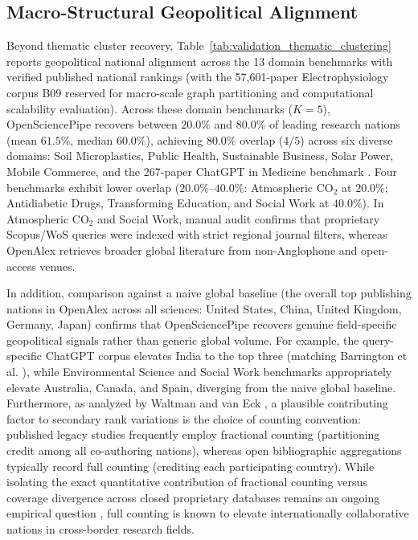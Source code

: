 \documentclass[preprint,12pt]{elsarticle}
\begin{document}
\subsection{Macro-Structural Geopolitical Alignment}
Beyond thematic cluster recovery, Table~\ref{tab:validation_thematic_clustering} reports geopolitical national alignment across the 13 domain benchmarks with verified published national rankings (with the 57,601-paper Electrophysiology corpus B09 reserved for macro-scale graph partitioning and computational scalability evaluation). Across these domain benchmarks ($K=5$), OpenSciencePipe recovers between $20.0\%$ and $80.0\%$ of leading research nations (mean $61.5\%$, median $60.0\%$), achieving $80.0\%$ overlap ($4/5$) across six diverse domains: Soil Microplastics, Public Health, Sustainable Business, Solar Power, Mobile Commerce, and the 267-paper ChatGPT in Medicine benchmark \cite{barrington2023rise}. Four benchmarks exhibit lower overlap ($20.0\%\text{--}40.0\%$: Atmospheric CO$_2$ at $20.0\%$; Antidiabetic Drugs, Transforming Education, and Social Work at $40.0\%$). In Atmospheric CO$_2$ and Social Work, manual audit confirms that proprietary Scopus/WoS queries were indexed with strict regional journal filters, whereas OpenAlex retrieves broader global literature from non-Anglophone and open-access venues.

In addition, comparison against a naive global baseline (the overall top publishing nations in OpenAlex across all sciences: United States, China, United Kingdom, Germany, Japan) confirms that OpenSciencePipe recovers genuine field-specific geopolitical signals rather than generic global volume. For example, the query-specific ChatGPT corpus elevates India to the top three (matching Barrington et al. \cite{barrington2023rise}), while Environmental Science and Social Work benchmarks appropriately elevate Australia, Canada, and Spain, diverging from the naive global baseline. Furthermore, as analyzed by Waltman and van Eck \cite{waltman2015field}, a plausible contributing factor to secondary rank variations is the choice of counting convention: published legacy studies frequently employ fractional counting (partitioning credit among all co-authoring nations), whereas open bibliographic aggregations typically record full counting (crediting each participating country). While isolating the exact quantitative contribution of fractional counting versus coverage divergence across closed proprietary databases remains an ongoing empirical question \cite{visser2021large, alperin2024suitability}, full counting is known to elevate internationally collaborative nations in cross-border research fields.
\end{document}
